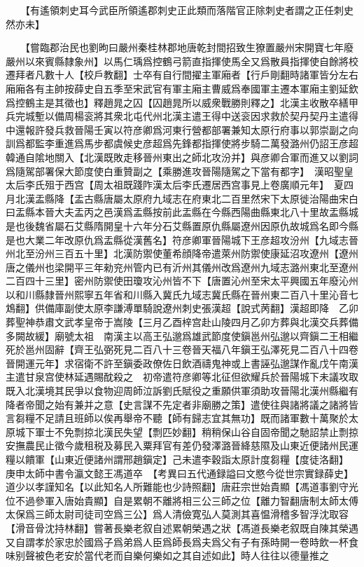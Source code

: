 　　【有遙領刺史耳今武臣所領遙郡刺史正此類而落階官正除刺史者謂之正任刺史然亦未】

　　【嘗臨郡治民也劉昫曰嚴州秦桂林郡地唐乾封間招致生獠置嚴州宋開寶七年廢嚴州以來賓縣隸象州】以馬仁瑀爲控鶴弓箭直指揮使馬全又爲散員指揮使自餘將校遷拜者凡數十人【校戶教翻】士卒有自行間擢主軍廂者【行戶剛翻時諸軍皆分左右廂廂各有主帥按薛史自五季至宋武官有軍主廂主曹威爲奉國軍主遷本軍廂主劉延欽爲控鶴主是其徵也】釋趙晁之囚【囚趙晁所以威衆戰勝則釋之】北漢主收散卒繕甲兵完城塹以備周楊衮將其衆北屯代州北漢主遣王得中送衮因求救於契丹契丹主遣得中還報許發兵救晉陽壬寅以符彦卿爲河東行營都部署兼知太原行府事以郭崇副之向訓爲都監李重進爲馬步都虞候史彦超爲先鋒都指揮使將步騎二萬發潞州仍詔王彦超韓通自隂地關入【北漢既敗走移晉州東出之師北攻汾并】與彦卿合軍而進又以劉詞爲隨駕部署保大節度使白重贊副之【乘勝進攻晉陽隨駕之下當有都字】　漢昭聖皇太后李氏殂于西宫【周太祖既踐阼漢太后李氏遷居西宫事見上卷廣順元年】　夏四月北漢盂縣降【盂古縣唐屬太原府九域志在府東北二百里然宋下太原徙治陽曲宋白曰盂縣本晉大夫盂丙之邑漢爲盂縣按前此盂縣在今縣西陽曲縣東北八十里故盂縣城是也後魏省屬石艾縣隋開皇十六年分石艾縣置原仇縣屬遼州因原仇故城爲名即今縣是也大業二年改原仇爲盂縣從漢舊名】符彦卿軍晉陽城下王彦超攻汾州【九域志晉州北至汾州三百五十里】北漢防禦使董希顔降帝遣萊州防禦使康延沼攻遼州【遼州唐之儀州也梁開平三年勑兖州管内已有沂州其儀州改爲遼州九域志潞州東北至遼州二百四十三里】密州防禦使田瓊攻沁州皆不下【唐置沁州至宋太平興國五年廢沁州以和川縣隸晉州熙寧五年省和川縣入冀氏九域志冀氏縣在晉州東二百八十里沁音七鴆翻】供備庫副使太原李謙溥單騎說遼州刺史張漢超【說式苪翻】漢超即降　乙卯葬聖神恭肅文武孝皇帝于嵩陵【三月乙酉梓宫赴山陵四月乙卯方葬與北漢交兵葬備多闕故緩】廟號太祖　南漢主以高王弘邈爲雄武節度使鎭邕州弘邈以齊鎭二王相繼死於邕州固辭【齊王弘弼死見二百八十三卷晉天福八年鎭王弘澤死見二百八十四卷晉開運元年】求宿衛不許至鎭委政僚佐日飲酒禱鬼神或上書誣弘邈謀作亂戊午南漢主遣甘泉宫使林延遇賜酖殺之　初帝遣符彦卿等北征但欲耀兵於晉陽城下未議攻取既入北漢境其民爭以食物迎周師泣訴劉氏賦役之重願供軍須助攻晉陽北漢州縣繼有降者帝聞之始有兼并之意【史言謀不先定者非廟勝之策】遣使往與諸將議之諸將皆言芻糧不足請且班師以俟再舉帝不聽【師有歸志宜其無功】既而諸軍數十萬聚於太原城下軍士不免剽掠北漢民失望【剽匹妙翻】稍稍保山谷自固帝聞之馳詔禁止剽掠安撫農民止徵今歲租税及募民入粟拜官有差仍發澤潞晉絳慈隰及山東近便諸州民運糧以饋軍【山東近便諸州謂邢趙鎭定】己未遣李穀詣太原計度芻糧【度徒洛翻】　庚申太師中書令瀛文懿王馮道卒　【考異曰五代通録謚曰文愍今從世宗實録薛史】道少以孝謹知名【以此知名人所難能也少詩照翻】唐莊宗世始貴顯【馮道事劉守光位不過參軍入唐始貴顯】自是累朝不離將相三公三師之位【離力智翻唐制太師太傅太保爲三師太尉司徒司空爲三公】爲人清儉寛弘人莫測其喜愠滑稽多智浮沈取容【滑音骨沈持林翻】嘗著長樂老叙自述累朝榮遇之狀【馮道長樂老叙既自陳其榮遇又自謂孝於家忠於國爲子爲弟爲人臣爲師長爲夫爲父有子有孫時開一卷時飲一杯食味别聲被色老安於當代老而自樂何樂如之其自述如此】時人往往以德量推之

